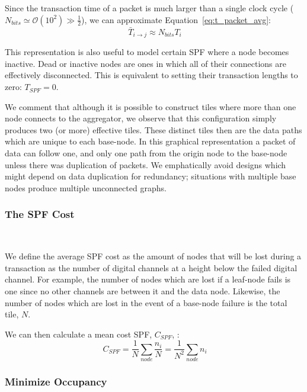 Since the transaction time of a packet is much larger than a single clock cycle ($N_{bits} \simeq \mathcal{O}(10^{2}) \gg \frac{1}{2}$), we can approximate Equation~\ref{eq:t_packet_avg}:
\begin{equation}~\label{eq:t_packet}
\bar{T}_{i\rightarrow j} \approx N_{bits}T_{i}
\end{equation}

This representation is also useful to model certain SPF where a node becomes inactive.
Dead or inactive nodes are ones in which all of their connections are effectively disconnected.
This is equivalent to setting their transaction lengths to zero: $T_{SPF} = 0$.

We comment that although it is possible to construct tiles where more than one node connects to the aggregator, we observe that this configuration simply produces two (or more) effective tiles.
These distinct tiles then are the data paths which are unique to each base-node.
In this graphical representation a packet of data can follow one, and only one path from the origin node to the base-node unless there was duplication of packets.
We emphatically avoid designs which might depend on data duplication for redundancy; situations with multiple base nodes produce multiple unconnected graphs.

\subsubsection{The SPF Cost}~\label{sec:spf_cost}

We define the average SPF cost as the amount of nodes that will be lost during a transaction as the number of digital channels at a height below the failed digital channel.
For example, the number of nodes which are lost if a leaf-node fails is one since no other channels are between it and the data node.
Likewise, the number of nodes which are lost in the event of a base-node failure is the total tile, $N$.

We can then calculate a mean cost SPF, $C_{SPF}$, :
\begin{equation}~\label{eq:cspf}
  C_{SPF} = \frac{1}{N}\sum_{node} \frac{n_{i}}{N} = \frac{1}{N^{2}}\sum_{node} n_{i}
\end{equation}

\subsubsection{Minimize Occupancy}~\label{sec:min_conn}

